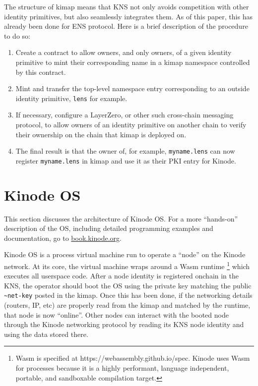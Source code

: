 \documentclass[runningheads]{llncs}
\begin{document}
The structure of kimap means that KNS not only avoids competition with other identity primitives, but also seamlessly integrates them.
As of this paper, this has already been done for ENS protocol.
Here is a brief description of the procedure to do so:
\begin{enumerate}
    \item Create a contract to allow owners, and only owners, of a given identity primitive to mint their corresponding name in a kimap namespace controlled by this contract.
    \item Mint and transfer the top-level namespace entry corresponding to an outside identity primitive, \verb|lens| for example.
    \item If necessary, configure a LayerZero, or other such cross-chain messaging protocol, to allow owners of an identity primitive on another chain to verify their ownership on the chain that kimap is deployed on.
    \item The final result is that the owner of, for example, \verb|myname.lens| can now register \verb|myname.lens| in kimap and use it as their PKI entry for Kinode.
\end{enumerate}

\section{Kinode OS}
\label{sec:os}

This section discusses the architecture of Kinode OS.
For a more ``hands-on'' description of the OS, including detailed programming examples and documentation, go to \href{https://book.kinode.org/}{book.kinode.org}.

Kinode OS is a process virtual machine run to operate a ``node'' on the Kinode network.
At its core, the virtual machine wraps around a Wasm runtime
\footnote{Wasm is specified at https://webassembly.github.io/spec. Kinode uses Wasm for processes because it is a highly performant, language independent, portable, and sandboxable compilation target.}
which executes all userspace code.
After a node identity is registered onchain in the KNS, the operator should boot the OS using the private key matching the public \verb|~net-key| posted in the kimap.
Once this has been done, if the networking details (routers, IP, etc) are properly read from the kimap and matched by the runtime, that node is now ``online''.
Other nodes can interact with the booted node through the Kinode networking protocol by reading its KNS node identity and using the data stored there.
\end{document}

